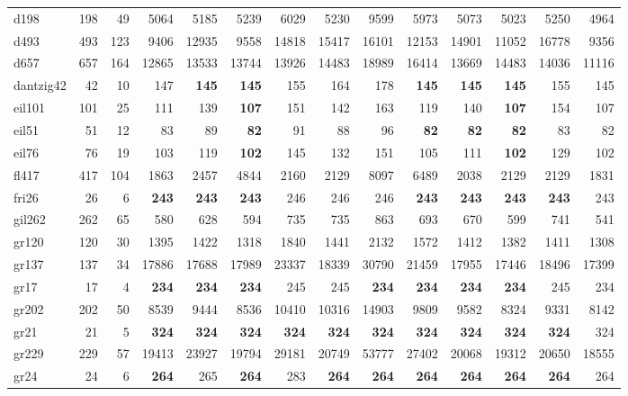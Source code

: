 {\begin{longtable}{l r r r r r r r r r r r r r}
d198 & 198 & 49 & 5064 & 5185 & 5239 & 6029 & 5230 & 9599 & 5973 & 5073 & 5023 & 5250 & 4964 \\
d493 & 493 & 123 & 9406 & 12935 & 9558 & 14818 & 15417 & 16101 & 12153 & 14901 & 11052 & 16778 & 9356 \\
d657 & 657 & 164 & 12865 & 13533 & 13744 & 13926 & 14483 & 18989 & 16414 & 13669 & 14483 & 14036 & 11116 \\
dantzig42 & 42 & 10 & 147 & \textbf{145} & \textbf{145} & 155 & 164 & 178 & \textbf{145} & \textbf{145} & \textbf{145} & 155 & 145 \\
eil101 & 101 & 25 & 111 & 139 & \textbf{107} & 151 & 142 & 163 & 119 & 140 & \textbf{107} & 154 & 107 \\
eil51 & 51 & 12 & 83 & 89 & \textbf{82} & 91 & 88 & 96 & \textbf{82} & \textbf{82} & \textbf{82} & 83 & 82 \\
eil76 & 76 & 19 & 103 & 119 & \textbf{102} & 145 & 132 & 151 & 105 & 111 & \textbf{102} & 129 & 102 \\
fl417 & 417 & 104 & 1863 & 2457 & 4844 & 2160 & 2129 & 8097 & 6489 & 2038 & 2129 & 2129 & 1831 \\
fri26 & 26 & 6 & \textbf{243} & \textbf{243} & \textbf{243} & 246 & 246 & 246 & \textbf{243} & \textbf{243} & \textbf{243} & \textbf{243} & 243 \\
gil262 & 262 & 65 & 580 & 628 & 594 & 735 & 735 & 863 & 693 & 670 & 599 & 741 & 541 \\
gr120 & 120 & 30 & 1395 & 1422 & 1318 & 1840 & 1441 & 2132 & 1572 & 1412 & 1382 & 1411 & 1308 \\
gr137 & 137 & 34 & 17886 & 17688 & 17989 & 23337 & 18339 & 30790 & 21459 & 17955 & 17446 & 18496 & 17399 \\
gr17 & 17 & 4 & \textbf{234} & \textbf{234} & \textbf{234} & 245 & 245 & \textbf{234} & \textbf{234} & \textbf{234} & \textbf{234} & 245 & 234 \\
gr202 & 202 & 50 & 8539 & 9444 & 8536 & 10410 & 10316 & 14903 & 9809 & 9582 & 8324 & 9331 & 8142 \\
gr21 & 21 & 5 & \textbf{324} & \textbf{324} & \textbf{324} & \textbf{324} & \textbf{324} & \textbf{324} & \textbf{324} & \textbf{324} & \textbf{324} & \textbf{324} & 324 \\
gr229 & 229 & 57 & 19413 & 23927 & 19794 & 29181 & 20749 & 53777 & 27402 & 20068 & 19312 & 20650 & 18555 \\
gr24 & 24 & 6 & \textbf{264} & 265 & \textbf{264} & 283 & \textbf{264} & \textbf{264} & \textbf{264} & \textbf{264} & \textbf{264} & \textbf{264} & 264 \\

\end{longtable}}

